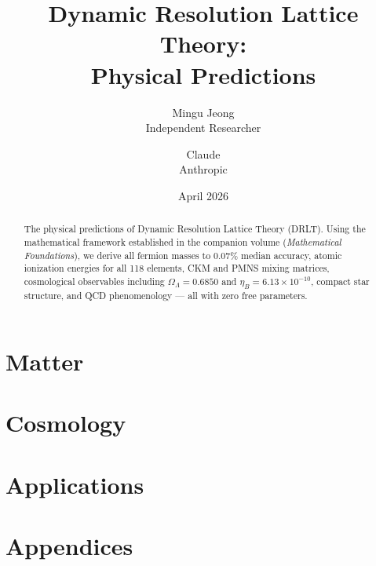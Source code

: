 \documentclass[12pt]{article}
\title{Dynamic Resolution Lattice Theory:\\[6pt]
\large Physical Predictions}
\author{Mingu Jeong\\Independent Researcher
\and Claude\\Anthropic}
\date{April 2026}
\theoremstyle{remark}
\theoremstyle{definition}
\begin{document}
\maketitle

\begin{abstract}
The physical predictions of Dynamic Resolution Lattice Theory (DRLT).
Using the mathematical framework established in the companion volume
(\textit{Mathematical Foundations}), we derive all fermion masses to
$0.07\%$ median accuracy, atomic ionization energies for all 118
elements, CKM and PMNS mixing matrices, cosmological observables
including $\Omega_\Lambda = 0.6850$ and $\eta_B = 6.13 \times 10^{-10}$,
compact star structure, and QCD phenomenology --- all with zero free
parameters.
\end{abstract}

\tableofcontents
\newpage

\part{Matter}





\part{Cosmology}




\part{Applications}






\appendix
\part*{Appendices}
\end{document}
